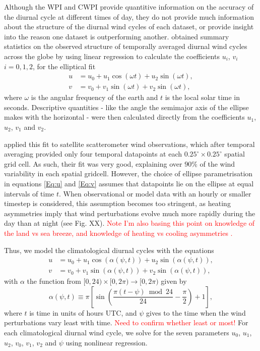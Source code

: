 \documentclass[alpha-refs]{wiley-article}
\begin{document}
Although the WPI and CWPI provide quantitive information on the accuracy of the diurnal cycle at different times of day, they do not provide much information about the structure of the diurnal wind cycles of each dataset, or provide insight into the reason one dataset is outperforming another. \citet{gille05} obtained summary statistics on the observed structure of temporally averaged diurnal wind cycles across the globe by using linear regression to calculate the coefficients $u_i$, $v_i$ $i=0,1,2$, for the elliptical fit 
\begin{align}
u &= u_0 + u_1 \cos(\omega t) + u_2 \sin(\omega t), \label{Eq:u} \\
v &= v_0 + v_1 \sin(\omega t) + v_2 \sin(\omega t), \label{Eq:v}
\end{align}
where $\omega$ is the angular frequency of the earth and $t$ is the local solar time in seconds. Descriptive quantities - like the angle the semimajor axis of the ellipse makes with the horizontal - were then calculated directly from the coefficients $u_1$, $u_2$, $v_1$ and $v_2$. 

\citet{gille05} applied this fit to satellite scatterometer wind observations, which after temporal averaging provided only four temporal datapoints at each $0.25^\circ \times 0.25^\circ$ spatial grid cell. As such, their fit was very good, explaining over $90\%$ of the wind variability in each spatial gridcell. However, the choice of ellipse parametrisation in equations \ref{Eq:u} and \ref{Eq:v} assumes that datapoints lie on the ellipse at equal intervals of time $t$. When observational or model data with an hourly or smaller timestep is considered, this assumption becomes too stringent, as heating asymmetries imply that wind perturbations evolve much more rapidly during the day than at night (see Fig. XX). \textcolor{red}{Note I'm also basing this point on knowledge of the land vs sea breeze, and knowledge of heating vs cooling asymmetries \citep[][e.g.]{brown17}.} 

Thus, we model the climatological diurnal cycles with the equations  
\begin{align}
u &= u_0 + u_1 \cos(\alpha(\psi,t)) + u_2 \sin(\alpha(\psi,t)), \label{Eq:u} \\
v &= v_0 + v_1 \sin(\alpha(\psi,t)) + v_2 \sin(\alpha(\psi,t)), \label{Eq:v}
\end{align}
with $\alpha$ the function from $[0,24) \times [0, 2\pi) \to [0, 2\pi)$ given by
\begin{equation}
\alpha(\psi,t) \equiv \pi \left[\sin\left( \frac{\pi (t - \psi)  \bmod 24}{24} - \frac{\pi}{2} \right) + 1 \right], \label{Eq:alpha}
\end{equation}
where $t$ is time in units of hours UTC, and $\psi$ gives to the time when the wind perturbations vary least with time. \textcolor{red}{Need to confirm whether least or most!} For each climatological diurnal wind cycle, we solve for the seven parameters $u_0$, $u_1$, $u_2$, $v_0$, $v_1$, $v_2$ and $\psi$ using nonlinear regression.
\end{document}
